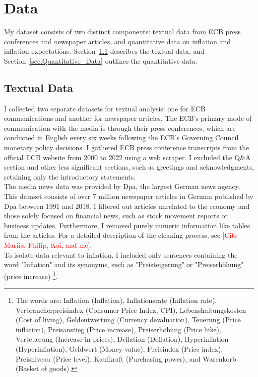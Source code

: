 \documentclass[review]{elsarticle}
\begin{document}
\section{Data} \label{sec:Data}

My dataset consists of two distinct components: textual data from ECB press conferences and newspaper articles, and quantitative data on inflation and inflation expectations. Section~\ref{sec:Textual_Data} describes the textual data, and Section~\ref{sec:Quantitative_Data} outlines the quantitative data.

\subsection{Textual Data} \label{sec:Textual_Data}

I collected two separate datasets for textual analysis: one for ECB communications and another for newspaper articles. The ECB's primary mode of communication with the media is through their press conferences, which are conducted in English every six weeks following the ECB's Governing Council monetary policy decisions. I gathered ECB press conference transcripts from the official ECB website from 2000 to 2022 using a web scraper. I excluded the Q\&A section and other less significant sections, such as greetings and acknowledgments, retaining only the introductory statements.
\\
The media news data was provided by Dpa, the largest German news agency. This dataset consists of over 7 million newspaper articles in German published by Dpa between 1991 and 2018. I filtered out articles unrelated to the economy and those solely focused on financial news, such as stock movement reports or business updates. Furthermore, I removed purely numeric information like tables from the articles. For a detailed description of the cleaning process, see \textcolor{red}{[Cite Mariia, Philip, Kai, and me]}.
\\
To isolate data relevant to inflation, I included only sentences containing the word "Inflation" and its synonyms, such as "Preisteigerung" or "Preiserhöhung" (price increase) \footnote{The words are: Inflation (Inflation), Inflationsrate (Inflation rate), Verbraucherpreisindex (Consumer Price Index, CPI), Lebenshaltungskosten (Cost of living), Geldentwertung (Currency devaluation), Teuerung (Price inflation), Preisanstieg (Price increase), Preiserhöhung (Price hike), Verteuerung (Increase in prices), Deflation (Deflation), Hyperinflation (Hyperinflation), Geldwert (Money value), Preisindex (Price index), Preisniveau (Price level), Kaufkraft (Purchasing power), and Warenkorb (Basket of goods).}.
\end{document}
